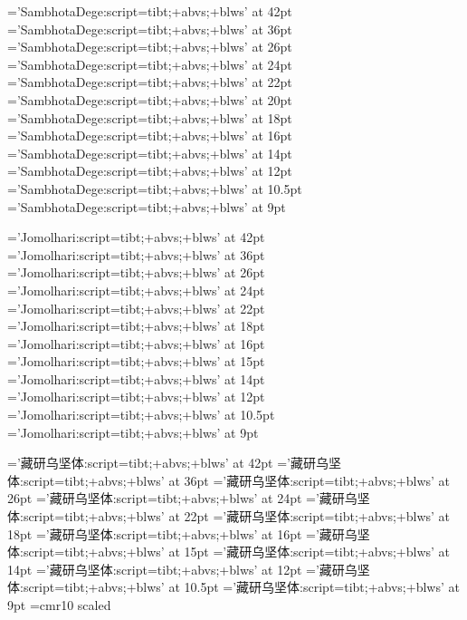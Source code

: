 ﻿
%
%

\def\TibeX{\hbox{Tib\kern-.1em \lower.5ex\hbox{E}\kern-.125em X}}

\font\SamThug='SambhotaDege:script=tibt;+abvs;+blws' at 42pt
\font\SamThugu='SambhotaDege:script=tibt;+abvs;+blws' at 36pt
\font\SamkCig='SambhotaDege:script=tibt;+abvs;+blws' at 26pt
\font\SamkCigChung='SambhotaDege:script=tibt;+abvs;+blws' at 24pt
\font\SamkNyis='SambhotaDege:script=tibt;+abvs;+blws' at 22pt
\font\SamkNyisChung='SambhotaDege:script=tibt;+abvs;+blws' at 20pt
\font\SamkSum='SambhotaDege:script=tibt;+abvs;+blws' at 18pt
\font\SamkSumChung='SambhotaDege:script=tibt;+abvs;+blws' at 16pt
\font\SambZhi='SambhotaDege:script=tibt;+abvs;+blws' at 14pt
\font\SambZhiChung='SambhotaDege:script=tibt;+abvs;+blws' at 12pt
\font\SamlNga='SambhotaDege:script=tibt;+abvs;+blws' at 10.5pt
\font\SamlNgaChung='SambhotaDege:script=tibt;+abvs;+blws' at 9pt
\let\Sam=\SamkNyisChung \let\sam=\Sam
\let\SamChe=\SamkNyis
\let\SamAu=\SamkSum

\font\JoThig='Jomolhari:script=tibt;+abvs;+blws' at 42pt
\font\JoThigu='Jomolhari:script=tibt;+abvs;+blws' at 36pt
\font\JokCig='Jomolhari:script=tibt;+abvs;+blws' at 26pt
\font\JokCigChung='Jomolhari:script=tibt;+abvs;+blws' at 24pt
\font\JokNyis='Jomolhari:script=tibt;+abvs;+blws' at 22pt
\font\JokNyisChung='Jomolhari:script=tibt;+abvs;+blws' at 18pt
\font\JokSum='Jomolhari:script=tibt;+abvs;+blws' at 16pt
\font\JokSumChung='Jomolhari:script=tibt;+abvs;+blws' at 15pt
\font\JobZhi='Jomolhari:script=tibt;+abvs;+blws' at 14pt
\font\JobZhiChung='Jomolhari:script=tibt;+abvs;+blws' at 12pt
\font\JolNga='Jomolhari:script=tibt;+abvs;+blws' at 10.5pt
\font\JolNgaChung='Jomolhari:script=tibt;+abvs;+blws' at 9pt
\let\Jo=\JokNyisChung \let\jo=\JokSum
\let\JoChe=\JokNyis
\let\JoAu=\JokSum

\font\ZhibThig='藏研乌坚体:script=tibt;+abvs;+blws' at 42pt
\font\ZhibThigu='藏研乌坚体:script=tibt;+abvs;+blws' at 36pt
\font\ZhibkCig='藏研乌坚体:script=tibt;+abvs;+blws' at 26pt
\font\ZhibkCigChung='藏研乌坚体:script=tibt;+abvs;+blws' at 24pt
\font\ZhibkNyis='藏研乌坚体:script=tibt;+abvs;+blws' at 22pt
\font\ZhibkNyisChung='藏研乌坚体:script=tibt;+abvs;+blws' at 18pt
\font\ZhibkSum='藏研乌坚体:script=tibt;+abvs;+blws' at 16pt
\font\ZhibkSumChung='藏研乌坚体:script=tibt;+abvs;+blws' at 15pt
\font\ZhibbZhi='藏研乌坚体:script=tibt;+abvs;+blws' at 14pt
\font\ZhibbZhiChung='藏研乌坚体:script=tibt;+abvs;+blws' at 12pt
\font\ZhiblNga='藏研乌坚体:script=tibt;+abvs;+blws' at 10.5pt
\font\ZhiblNgaChung='藏研乌坚体:script=tibt;+abvs;+blws' at 9pt
\let\Zhib=\ZhibkSum \let\zhib=\ZhibkSum
\let\ZhibChe=\ZhibkNyis \let\ZhibAu=\ZhibkSumChung
%
\font\bigtenrm=cmr10 scaled
\def\romanfittib#1{\bws\lower9pt\hbox{\bigtenrm #1}\bws}
\def\LetterSkip{\nobreak\hskip0em plus.015em minus.003em}
\def\WordSkip{\hskip0em plus.05em minus.05em}
\def\BackwordSkip{\hskip.07em plus.03em minus.03em}
\def\SentenceSkip{\hskip.6em plus.3em minus.3em}
\let\ss=\SentenceSkip
\let\ws=\WordSkip
\let\bws=\BackwordSkip
\let\nb=\nobreak
\let\ls=\LetterSkip

